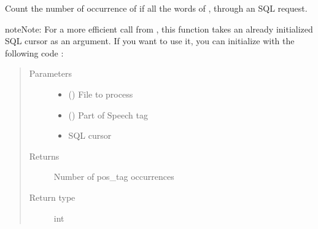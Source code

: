 \documentclass[letterpaper,10pt,english]{sphinxmanual}
\begin{document}

\begin{fulllineitems}
\label{\detokenize{analysis:loacore.analysis.frequencies.count_pos_tag}}
Count the number of occurrence of  if all the words of , through an SQL request.

\begin{sphinxadmonition}{note}{Note:}
For a more efficient call from {\hyperref[\detokenize{analysis:loacore.analysis.frequencies.pos_tag_frequencies}]{}}, this function takes an already initialized SQL
cursor as an argument.
If you want to use it, you can initialize  with the following code :

%
\begin{sphinxVerbatim}[commandchars=\\\{\}]
   
   
  
  
\end{sphinxVerbatim}
\end{sphinxadmonition}
\begin{quote}\begin{description}
\item[{Parameters}] \leavevmode\begin{itemize}
\item {} 
 () \textendash{} File to process

\item {} 
 () \textendash{} Part of Speech tag

\item {} 
 \textendash{} SQL cursor

\end{itemize}

\item[{Returns}] \leavevmode
Number of pos\_tag occurrences

\item[{Return type}] \leavevmode
int

\end{description}\end{quote}

\end{fulllineitems}
\end{document}
